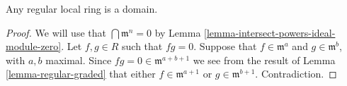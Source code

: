 \begin{lemma}
\label{lemma-regular-domain}
Any regular local ring is a domain.
\end{lemma}

\begin{proof}
We will use that $\bigcap \mathfrak m^n = 0$
by Lemma \ref{lemma-intersect-powers-ideal-module-zero}.
Let $f, g \in R$ such that $fg = 0$.
Suppose that $f \in \mathfrak m^a$ and
$g \in \mathfrak m^b$, with $a, b$ maximal.
Since $fg = 0 \in \mathfrak m^{a + b + 1}$
we see from the result of Lemma \ref{lemma-regular-graded}
that either $f \in \mathfrak m^{a + 1}$ or
$g \in \mathfrak m^{b + 1}$. Contradiction.
\end{proof}

